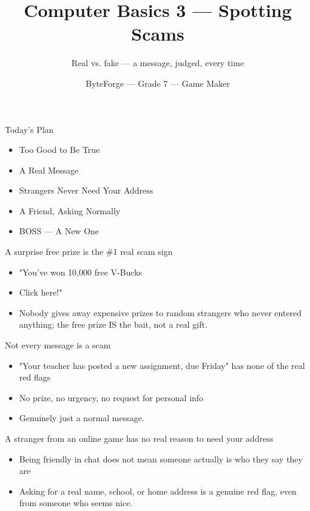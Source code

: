 \documentclass[aspectratio=169]{beamer}
\title{Computer Basics 3 — Spotting Scams}
\subtitle{Real vs. fake — a message, judged, every time}
\author{ByteForge --- Grade 7 --- Game Maker}
\date{}
\begin{document}
\begin{frame}
    \titlepage
\end{frame}

\begin{frame}{Today's Plan}
    \begin{itemize}
        \item Too Good to Be True
        \item A Real Message
        \item Strangers Never Need Your Address
        \item A Friend, Asking Normally
        \item[$\bigstar$] BOSS --- A New One
    \end{itemize}
\end{frame}

\begin{frame}{A surprise free prize is the \#1 real scam sign}
    \large
    \begin{itemize}
        \item "You've won 10,000 free V-Bucks
        \item Click here!"
        \item Nobody gives away expensive prizes to random strangers who never entered anything; the free prize IS the bait, not a real gift.
    \end{itemize}
\end{frame}


\begin{frame}{Not every message is a scam}
    \large
    \begin{itemize}
        \item "Your teacher has posted a new assignment, due Friday" has none of the real red flags
        \item No prize, no urgency, no request for personal info
        \item Genuinely just a normal message.
    \end{itemize}
\end{frame}


\begin{frame}{A stranger from an online game has no real reason to need your address}
    \large
    \begin{itemize}
        \item Being friendly in chat does not mean someone actually is who they say they are
        \item Asking for a real name, school, or home address is a genuine red flag, even from someone who seems nice.
    \end{itemize}
\end{frame}
\end{document}
